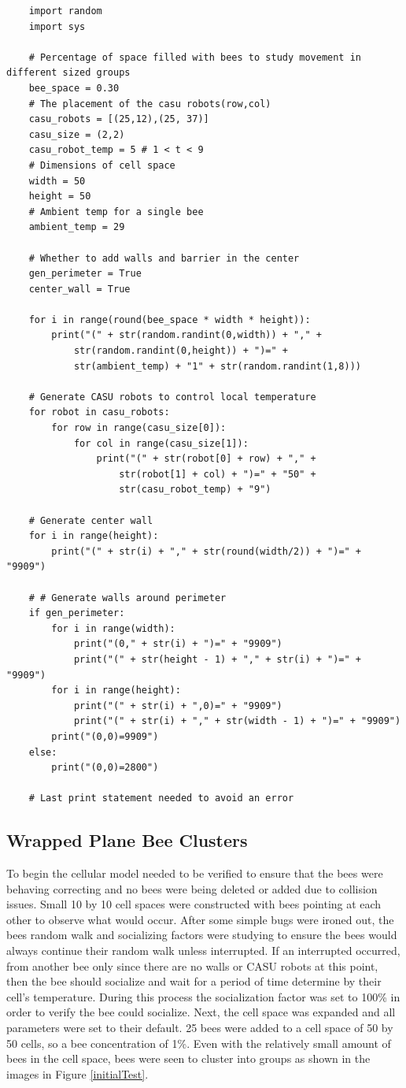 \documentclass[conference,compsoc,onecolumn]{IEEEtran}
\begin{document}
\begin{lstlisting}
	import random
	import sys
	
	# Percentage of space filled with bees to study movement in different sized groups
	bee_space = 0.30
	# The placement of the casu robots(row,col)
	casu_robots = [(25,12),(25, 37)]
	casu_size = (2,2)
	casu_robot_temp = 5 # 1 < t < 9
	# Dimensions of cell space
	width = 50
	height = 50
	# Ambient temp for a single bee
	ambient_temp = 29
	
	# Whether to add walls and barrier in the center
	gen_perimeter = True
	center_wall = True
	
	for i in range(round(bee_space * width * height)):
		print("(" + str(random.randint(0,width)) + "," + 
			str(random.randint(0,height)) + ")=" + 
			str(ambient_temp) + "1" + str(random.randint(1,8)))
	
	# Generate CASU robots to control local temperature
	for robot in casu_robots:
		for row in range(casu_size[0]):
			for col in range(casu_size[1]):
				print("(" + str(robot[0] + row) + "," + 
					str(robot[1] + col) + ")=" + "50" + 
					str(casu_robot_temp) + "9")
	
	# Generate center wall
	for i in range(height):
		print("(" + str(i) + "," + str(round(width/2)) + ")=" + "9909")
	
	# # Generate walls around perimeter
	if gen_perimeter:
		for i in range(width):
			print("(0," + str(i) + ")=" + "9909")
			print("(" + str(height - 1) + "," + str(i) + ")=" + "9909")
		for i in range(height):
			print("(" + str(i) + ",0)=" + "9909")
			print("(" + str(i) + "," + str(width - 1) + ")=" + "9909")
		print("(0,0)=9909")
	else:
		print("(0,0)=2800")
	
	# Last print statement needed to avoid an error
\end{lstlisting}

\subsection{Wrapped Plane Bee Clusters}

To begin the cellular model needed to be verified to ensure that the bees were behaving correcting and no bees were being deleted or added due to collision issues. Small 10 by 10 cell spaces were constructed with bees pointing at each other to observe what would occur. After some simple bugs were ironed out, the bees random walk and socializing factors were studying to ensure the bees would always continue their random walk unless interrupted. If an interrupted occurred, from another bee only since there are no walls or CASU robots at this point, then the bee should socialize and wait for a period of time determine by their cell's temperature. During this process the socialization factor was set to 100\% in order to verify the bee could socialize. Next, the cell space was expanded and all parameters were set to their default. 25 bees were added to a cell space of 50 by 50 cells, so a bee concentration of 1\%. Even with the relatively small amount of bees in the cell space, bees were seen to cluster into groups as shown in the images in Figure \ref{initialTest}.
\end{document}
